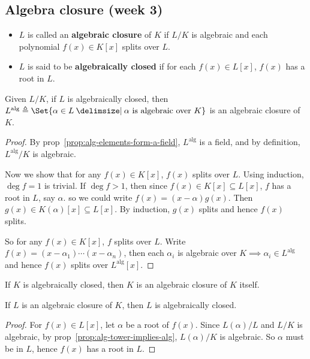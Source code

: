 \subsection{Algebra closure (week 3)}

\begin{definition} \hfill
  \begin{itemize}
    \item $L$ is called an {\bf algebraic closure} of $K$ if $L/K$ is algebraic and
      each polynomial $f(x) \in K[x]$ splits over $L$.
    \item $L$ is said to be {\bf algebraically closed} if for each $f(x) \in L[x]$,
      $f(x)$ has a root in $L$.
  \end{itemize}
\end{definition}

\begin{prop}
  Given $L/K$, if $L$ is algebraically closed, then $L^\text{alg} \triangleq
  \Set{\alpha \in L \given \alpha \text{ is algebraic over } K}$ is an
  algebraic closure of $K$.

  \begin{proof}
    By prop~\ref{prop:alg-elements-form-a-field}, $L^\text{alg}$ is a field, and
    by definition, $L^\text{alg}/K$ is algebraic.

    Now we show that for any $f(x) \in K[x]$, $f(x)$ splits over $L$.
    Using induction, $\deg f = 1$ is trivial. If $\deg f > 1$, then since
    $f(x) \in K[x] \subseteq L[x]$, $f$ has a root in $L$, say $\alpha$. so we could
    write $f(x) = (x - \alpha) g(x)$. Then $g(x) \in K(\alpha)[x] \subseteq L[x]$.
    By induction, $g(x)$ splits and hence $f(x)$ splits.

    So for any $f(x) \in K[x]$, $f$ splits over $L$. Write
    $f(x) = (x - \alpha_1) \dotsm (x - \alpha_n)$, then each $\alpha_i$ is
    algebraic over $K \implies \alpha_i \in L^\text{alg}$ and hence
    $f(x)$ splits over $L^\text{alg}[x]$.
  \end{proof}
\end{prop}

\begin{coro}
  If $K$ is algebraically closed, then $K$ is an algebraic closure of $K$ itself.
\end{coro}

\begin{prop}
  If $L$ is an algebraic closure of $K$, then $L$ is algebraically closed.

  \begin{proof}
    For $f(x) \in L[x]$, let $\alpha$ be a root of $f(x)$. Since $L(\alpha)/L$ and
    $L/K$ is algebraic, by prop~\ref{prop:alg-tower-implies-alg}, $L(\alpha)/K$ is algebraic.
    So $\alpha$ must be in $L$, hence $f(x)$ has a root in $L$.
  \end{proof}
\end{prop}

